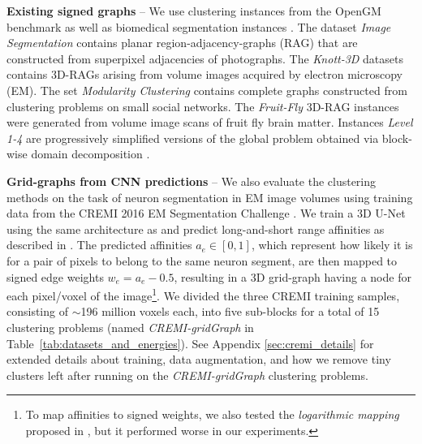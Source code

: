 \textbf{Existing signed graphs}  -- We use clustering instances from the OpenGM benchmark \cite{kappes2013comparative} as well as biomedical segmentation instances \cite{pape2017solving}. The dataset \emph{Image Segmentation} contains planar region-adjacency-graphs (RAG) that are constructed from superpixel adjacencies of photographs. The \emph{Knott-3D} datasets contains 3D-RAGs arising from volume images acquired by electron microscopy (EM). The set \emph{Modularity Clustering} contains complete graphs constructed from clustering problems on small social networks. The \emph{Fruit-Fly} 3D-RAG instances were generated from volume image scans of fruit fly brain matter. Instances \emph{Level 1-4} are progressively simplified versions of the global problem obtained via block-wise domain decomposition \cite{pape2017solving}.

\textbf{Grid-graphs from CNN predictions} -- We also evaluate the clustering methods on the task of neuron segmentation in EM image volumes using training data from the CREMI 2016 EM Segmentation Challenge \cite{cremiChallenge}.
We train a 3D U-Net \cite{ronneberger2015u,cciccek20163d} using the same architecture as \cite{funke2018large} and predict long-and-short range affinities 
as described in \cite{lee2017superhuman}. The predicted affinities $a_e\in[0,1]$, which represent how likely it is for a pair of pixels to belong to the same neuron segment, are then mapped to signed edge weights $w_e=a_e-0.5$, resulting in a 3D grid-graph having a node for each pixel/voxel of the  image\footnote{To map affinities to signed weights, we also tested the \emph{logarithmic mapping} proposed in \cite{finkel2008enforcing,andres2012globally}, but it performed worse in our experiments.}. 
We divided the three CREMI training samples, consisting of $\sim$196 million voxels each, into five sub-blocks for a total of 15 clustering problems (named \emph{CREMI-gridGraph} in Table~\ref{tab:datasets_and_energies}). See Appendix \ref{sec:cremi_details} for extended details about training, data augmentation, and how we remove tiny clusters left after running \algname{} on the \emph{CREMI-gridGraph} clustering problems.

